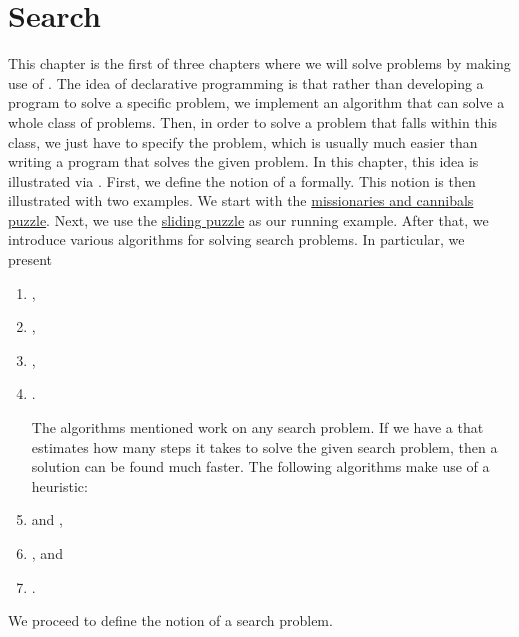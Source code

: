 \chapter{Search}
This chapter is the first of three chapters where we will solve problems by making use of
. 
The idea of declarative programming is that rather than developing a program to solve a specific problem,
we implement an algorithm that can solve a whole class of problems.  Then, in order to solve a problem that
falls within this class, we just have to specify the problem, which is usually much easier than writing a
program that solves the given problem.  In this chapter, this idea is illustrated via .
First, we define the notion of a  formally.  This notion is then illustrated with two
examples.  We start with the
\href{https://en.wikipedia.org/wiki/Missionaries_and_cannibals_problem}{missionaries and cannibals puzzle}.
Next, we use the  
\href{https://en.wikipedia.org/wiki/15_puzzle}{sliding puzzle} as our running example. 
After that, we introduce various algorithms for solving search problems.  In particular, we present
\begin{enumerate}
\item {},
\item {},
\item {},
\item {}.

      The algorithms mentioned work on any search problem.  If we have a  that estimates how many steps
      it takes to solve the given search problem, then a solution can be found much faster.
      The following algorithms make use of a heuristic:
      
\item {} and ,
\item {}, and
\item {}.
\end{enumerate}
We proceed to define the notion of a search problem.

